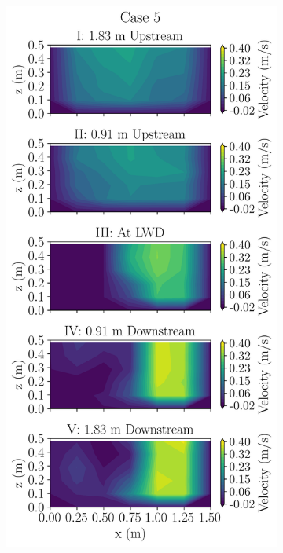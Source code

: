 \documentclass[preview, border=2pt]{standalone}
\begin{document}
\begin{figure}
\begin{subfigure}[b]{0.24\textwidth}
     \end{subfigure}
     \hfill     
     \begin{subfigure}[b]{0.24\textwidth}
         \centering
         \caption{}
         \includegraphics[width=\textwidth]{Case5_velocity_contours.png}

\end{subfigure}
\end{figure}
\end{document}
